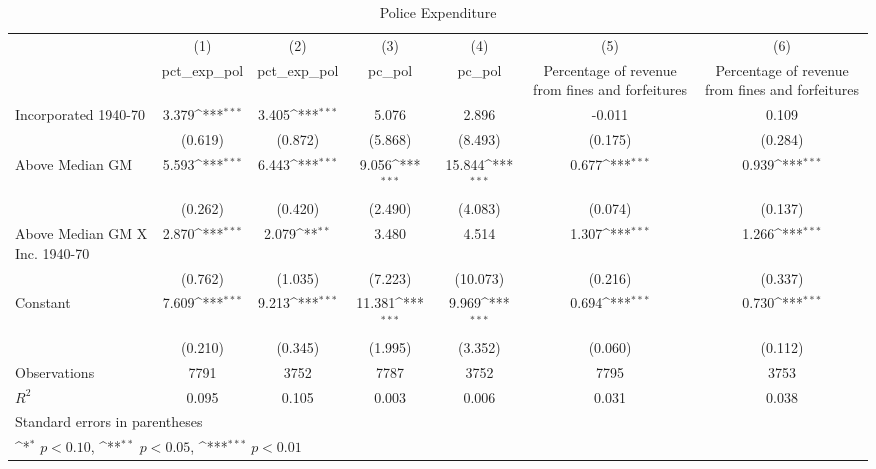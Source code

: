 \begin{table}[htbp]\centering
\def\sym#1{\ifmmode^{#1}\else\(^{#1}\)\fi}
\caption{Police Expenditure}
\begin{tabular}{l*{6}{c}}
\hline\hline
                    &\multicolumn{1}{c}{(1)}&\multicolumn{1}{c}{(2)}&\multicolumn{1}{c}{(3)}&\multicolumn{1}{c}{(4)}&\multicolumn{1}{c}{(5)}&\multicolumn{1}{c}{(6)}\\
                    &\multicolumn{1}{c}{pct\_exp\_pol}&\multicolumn{1}{c}{pct\_exp\_pol}&\multicolumn{1}{c}{pc\_pol}&\multicolumn{1}{c}{pc\_pol}&\multicolumn{1}{c}{Percentage of revenue from fines and forfeitures}&\multicolumn{1}{c}{Percentage of revenue from fines and forfeitures}\\
\hline
Incorporated 1940-70&       3.379\sym{***}&       3.405\sym{***}&       5.076         &       2.896         &      -0.011         &       0.109         \\
                    &     (0.619)         &     (0.872)         &     (5.868)         &     (8.493)         &     (0.175)         &     (0.284)         \\
[1em]
Above Median GM     &       5.593\sym{***}&       6.443\sym{***}&       9.056\sym{***}&      15.844\sym{***}&       0.677\sym{***}&       0.939\sym{***}\\
                    &     (0.262)         &     (0.420)         &     (2.490)         &     (4.083)         &     (0.074)         &     (0.137)         \\
[1em]
Above Median GM X Inc. 1940-70&       2.870\sym{***}&       2.079\sym{**} &       3.480         &       4.514         &       1.307\sym{***}&       1.266\sym{***}\\
                    &     (0.762)         &     (1.035)         &     (7.223)         &    (10.073)         &     (0.216)         &     (0.337)         \\
[1em]
Constant            &       7.609\sym{***}&       9.213\sym{***}&      11.381\sym{***}&       9.969\sym{***}&       0.694\sym{***}&       0.730\sym{***}\\
                    &     (0.210)         &     (0.345)         &     (1.995)         &     (3.352)         &     (0.060)         &     (0.112)         \\
\hline
Observations        &        7791         &        3752         &        7787         &        3752         &        7795         &        3753         \\
\(R^{2}\)           &       0.095         &       0.105         &       0.003         &       0.006         &       0.031         &       0.038         \\
\hline\hline
\multicolumn{7}{l}{\footnotesize Standard errors in parentheses}\\
\multicolumn{7}{l}{\footnotesize \sym{*} \(p<0.10\), \sym{**} \(p<0.05\), \sym{***} \(p<0.01\)}\\
\end{tabular}
\end{table}

